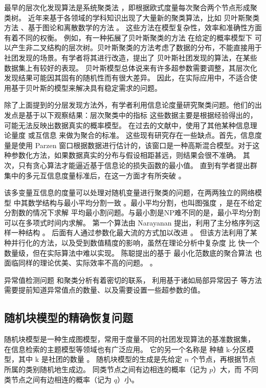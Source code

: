 最早的层次化发现算法是系统聚类法 \cite{slink}，即根据欧式度量每次聚合两个节点形成聚类树。
近年来基于各领域的学科知识出现了大量新的聚类算法，比如
贝叶斯聚类方法 \cite{bhc}、基于图论和离散数学的方法 \cite{dasgupta2016cost}
。
这些方法在模型复杂性，效率和准确性方面有着不同的权衡。
例如，有一种拓展了贝叶斯聚类的方法 \cite{blundell2011discovering}
在给定的概率模型下
可以产生非二叉结构的层次树。贝叶斯聚类的方法考虑了数据的分布，不能直接用于社团发现的场景。有学者将其进行改造，提出了
贝叶斯社团发现的算法\cite{RN23}，在某些数据集上有较好的表现。
贝叶斯模型总体说来有许多超参数需要调整，其层次化发现结果可能因其固有的随机性而有很大差异。 因此，在实际应用中，不适合使用基于贝叶斯的模型来解决具有稳定需求的问题。 

除了上面提到的分层发现方法外，有学者利用信息论度量研究聚类问题。他们的出发点是基于以下观察结果：层次聚类中的指标
这些数据主要是根据经验得出的，可能无法反映出数据真实的概率模型。
在过去的文献中，使用了其他某种信息理论量度 \cite{ic2002} 或互信息\cite{mim}
来做为聚合的标准。
这些现有研究存在一些缺点。首先，信息度量是使用 Parzen 窗口根据数据进行估计的，该窗口是一种高斯混合模型。对于这种参数化方法，如果数据真实的分布与假设相距甚远，则结果会很不准确。
其次，只有贪心算法才能逼近基于信息论的损失函数的最小值。 
直到有学者提出群集中的多元互信息度量标准后，在这一方面才有所突破 \cite{ic2016}。 

该多变量互信息的度量可以处理对随机变量进行聚类的问题，在两两独立的网络模型 \cite{pin}
中其数学结构与最小平均分割一致  \cite{mac}。最小平均分割，也叫图强度 \cite{cunningham1985optimal}，是在不给定分割数的情况下求解
平均最小割问题。与最小割是NP难不同的是，最小平均分割可以在多项式时间内求解。
第一个算法由 Narayanan 提出，利用了主分格序列这样一种结构 \cite{narayanan}。
后面有人通过参数化最大流的方式加以改进 \cite{pic}。
但该方法利用了某种并行化的方法，以及受到数值精度的影响，虽然在理论分析中复杂度
比 \cite{narayanan} 快一个数量级，但在实际算法中难以实现。
陈聪提出的基于 最小化范数底的聚合算法 也面临同样的理论优美、实际效率不高的问题。 \cite{chan2020agglomerative}。

异常值检测问题 \cite{grubbs1969procedures} 和聚类分析有着密切的联系，
利用基于诸如局部异常因子 \cite{Breunig} 等方法需要提前知道异常值点的数量、以及需要设置一些超参数的值。
\subsection{随机块模型的精确恢复问题}
随机块模型是一种生成图模型，常用于度量不同的社团发现算法的基准数据集，
在信息检索的主题模型等领域也有广泛应用\cite{Gerlach_2018}。
它的另一个名称是 种植 k-分区模型，其中 k 是社团的数量 。
随机块模型的生成是先给定 $n$ 个节点，再根据节点所属的类别随机地生成边。
同类节点之间有边相连的概率（记为 $p$）大，而
不同类节点之间有边相连的概率（记为 $q$）小。\cite{abbe2017community}

